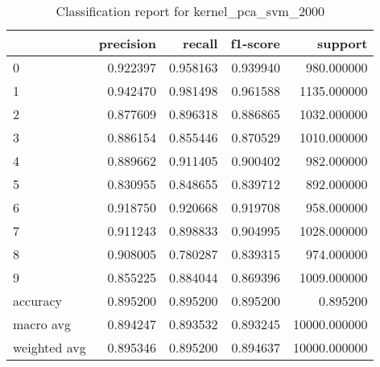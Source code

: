 \begin{table}[htb!]
\centering
\caption{Classification report for kernel_pca_svm_2000}
\label{tab:classification-report-kernel_pca_svm_2000}
\begin{tabular}{lrrrr}
\toprule
 & precision & recall & f1-score & support \\
\midrule
0 & 0.922397 & 0.958163 & 0.939940 & 980.000000 \\
1 & 0.942470 & 0.981498 & 0.961588 & 1135.000000 \\
2 & 0.877609 & 0.896318 & 0.886865 & 1032.000000 \\
3 & 0.886154 & 0.855446 & 0.870529 & 1010.000000 \\
4 & 0.889662 & 0.911405 & 0.900402 & 982.000000 \\
5 & 0.830955 & 0.848655 & 0.839712 & 892.000000 \\
6 & 0.918750 & 0.920668 & 0.919708 & 958.000000 \\
7 & 0.911243 & 0.898833 & 0.904995 & 1028.000000 \\
8 & 0.908005 & 0.780287 & 0.839315 & 974.000000 \\
9 & 0.855225 & 0.884044 & 0.869396 & 1009.000000 \\
accuracy & 0.895200 & 0.895200 & 0.895200 & 0.895200 \\
macro avg & 0.894247 & 0.893532 & 0.893245 & 10000.000000 \\
weighted avg & 0.895346 & 0.895200 & 0.894637 & 10000.000000 \\
\bottomrule
\end{tabular}
\end{table}

